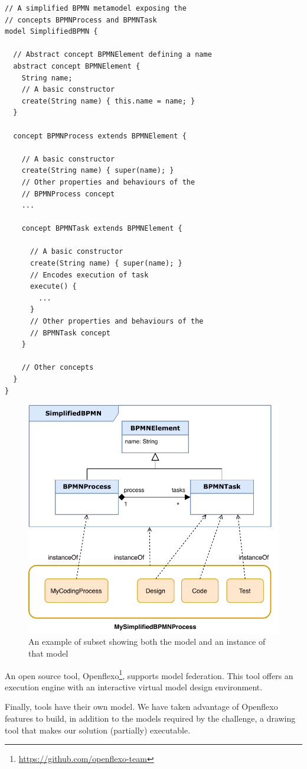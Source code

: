\begin{lstlisting}
// A simplified BPMN metamodel exposing the
// concepts BPMNProcess and BPMNTask
model SimplifiedBPMN {

  // Abstract concept BPMNElement defining a name
  abstract concept BPMNElement {
    String name;
    // A basic constructor
    create(String name) { this.name = name; }
  }

  concept BPMNProcess extends BPMNElement {

    // A basic constructor
    create(String name) { super(name); }
    // Other properties and behaviours of the
    // BPMNProcess concept
    ...

    concept BPMNTask extends BPMNElement {

      // A basic constructor
      create(String name) { super(name); }
      // Encodes execution of task
      execute() {
        ...
      }
      // Other properties and behaviours of the
      // BPMNTask concept
    }

    // Other concepts
  }
}
\end{lstlisting}

\begin{figure}[t]
    \centering
    \includegraphics[width=\columnwidth]{Figures/BPMNSubsetExample-1.5.pdf}
    \caption{An example of \BPMN subset showing both the model and an instance of that model}
    \label{fig:BPMNSubsetExample}
\end{figure}


An open source tool,
Openflexo\footnote{\url{https://github.com/openflexo-team}}\!, supports model federation. This tool offers an \FML
execution engine with an interactive virtual model design environment.

Finally, tools have their own model. We have taken advantage of Openflexo
features to build, in addition to the models  required by the challenge, a
drawing tool that makes our solution (partially) executable.
